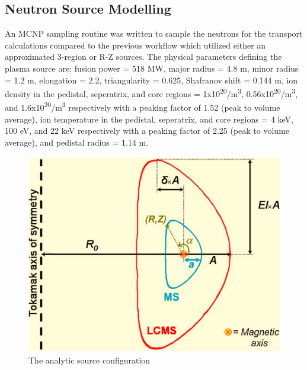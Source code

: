 \documentclass[12pt, letterpaper]{elsarticle}
\begin{document}
\subsection{Neutron Source Modelling} \label{Neutron Source Modelling}
An MCNP sampling routine was written to sample the neutrons for the transport calculations compared to the previous workflow which utilized either an approximated 3-region or R-Z sources. The physical parameters defining the plasma source \cite{ref_3} are: fusion power = 518 MW, major radius = 4.8 m, minor radius = 1.2 m, elongation = 2.2, triangularity = 0.625, Shafranov shift = 0.144 m, ion density in the pedistal, seperatrix, and core regions = 1x10\textsuperscript{20}/m\textsuperscript{3}, 0.56x10\textsuperscript{20}/m\textsuperscript{3}, and 1.6x10\textsuperscript{20}/m\textsuperscript{3} respectively with a peaking factor of 1.52 (peak to volume average), ion temperature in the pedistal, seperatrix, and core regions  = 4 keV, 100 eV, and 22 keV respectively with a peaking factor of 2.25 (peak to volume average), and pedistal radius = 1.14 m.
\begin{figure}[h!]
  \centering
  \includegraphics[scale=0.2]{../plots/Analytic_source.png}
  \caption{The analytic source configuration}
  \label{fig:Analytic_source}
\end{figure}
\end{document}
